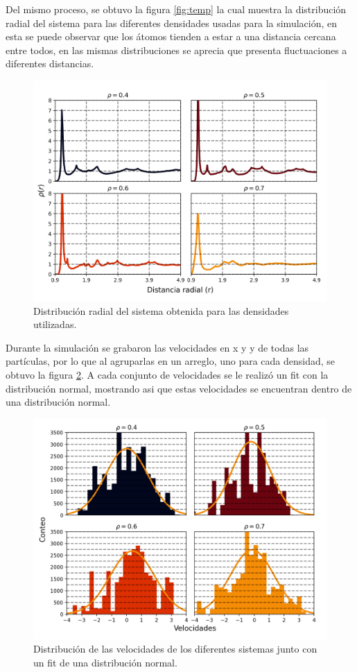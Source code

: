Del mismo proceso, se obtuvo la figura \ref{fig:temp} la cual muestra la distribución radial del sistema para las diferentes densidades usadas para la simulación, 
en esta se puede observar que los átomos tienden a estar a una distancia cercana entre todos, en las mismas distribuciones se aprecia que presenta
fluctuaciones a diferentes distancias.
\begin{figure}[H]
    \centering
    \includegraphics[scale=0.35]{../Graphics/Dis_rad.png}
    \caption{Distribución radial del sistema obtenida para las densidades utilizadas.}
    \label{fig:disrad}
\end{figure}
Durante la simulación se grabaron las velocidades en x y y de todas las partículas, por lo que al agruparlas en un arreglo, uno para cada densidad, se obtuvo
la figura \ref{fig:disvel}. A cada conjunto de velocidades se le realizó un fit con la distribución normal, mostrando asi que estas velocidades
se encuentran dentro de una distribución normal. 
\begin{figure}[H]
    \centering
    \includegraphics[scale=0.35]{../Graphics/vel.png}
    \caption{Distribución de las velocidades de los diferentes sistemas junto con un fit de una distribución normal.}
    \label{fig:disvel}
\end{figure}